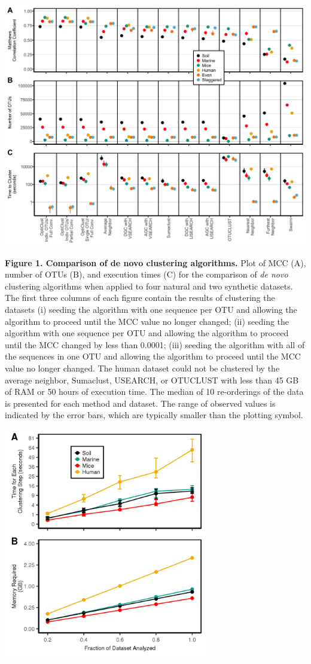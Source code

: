 \documentclass[11pt,]{article}
\begin{document}
\newpage

\includegraphics[width=6.0in]{results/figures/performance.png}

\textbf{Figure 1. Comparison of de novo clustering algorithms.} Plot of
MCC (A), number of OTUs (B), and execution times (C) for the comparison
of \emph{de novo} clustering algorithms when applied to four natural and
two synthetic datasets. The first three columns of each figure contain
the results of clustering the datasets (i) seeding the algorithm with
one sequence per OTU and allowing the algorithm to proceed until the MCC
value no longer changed; (ii) seeding the algorithm with one sequence
per OTU and allowing the algorithm to proceed until the MCC changed by
less than 0.0001; (iii) seeding the algorithm with all of the sequences
in one OTU and allowing the algorithm to proceed until the MCC value no
longer changed. The human dataset could not be clustered by the average
neighbor, Sumaclust, USEARCH, or OTUCLUST with less than 45 GB of RAM or
50 hours of execution time. The median of 10 re-orderings of the data is
presented for each method and dataset. The range of observed values is
indicated by the error bars, which are typically smaller than the
plotting symbol.

\newpage

\includegraphics[width=3.5in]{results/figures/speed_memory.png}
\end{document}
